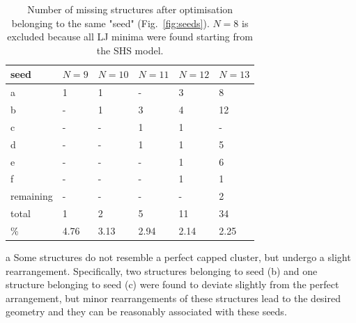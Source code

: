 %
%
\begin{table}\centering
    \begin{threeparttable}
    \caption{Number of missing structures after optimisation belonging to the
    same "seed" (Fig.\ \ref{fig:seeds}). $N=8$ is excluded because all LJ minima were
    found starting from the SHS model.}
    \label{tab:seeds}
    \begin{tabular}{llllll}\toprule
        seed      & $N=9$   & $N=10$  & $N=11$  & $N=12$  & $N=13$  \\ \midrule
        a         & 1    & 1    & -    & 3    & 8    \\
        b         & -    & 1    & 3    & 4    & 12\tnote{a}   \\
        c         & -    & -    & 1    & 1\tnote{a}    & -    \\
        d         & -    & -    & 1    & 1    & 5    \\
        e         & -    & -    & -    & 1    & 6    \\
        f         & -    & -    & -    & 1    & 1    \\
        remaining & -    & -    & -    & -    & 2    \\ 
        total     & 1    & 2    & 5    & 11   & 34   \\
        \%        & 4.76 & 3.13 & 2.94 & 2.14 & 2.25 \\ \bottomrule
    \end{tabular}
        \begin{tablenotes}
        \item[a]{Some structures do not resemble a perfect capped
        cluster, but undergo a slight rearrangement. Specifically, two structures belonging to seed (b) and one structure belonging to seed (c) were found to deviate slightly from the perfect arrangement, but minor rearrangements of these structures lead to the desired geometry and they can be reasonably associated with these seeds.}
        \end{tablenotes}
    \end{threeparttable}
\end{table}%
%
%
